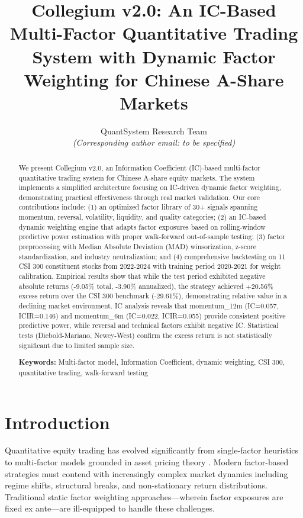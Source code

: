 \documentclass[12pt]{article}
\title{Collegium v2.0: An IC-Based Multi-Factor Quantitative Trading System with Dynamic Factor Weighting for Chinese A-Share Markets}
\author{QuantSystem Research Team\\
\textit{(Corresponding author email: to be specified)}
}
\date{}
\begin{document}
\maketitle

\begin{abstract}
We present Collegium v2.0, an Information Coefficient (IC)-based multi-factor quantitative trading system for Chinese A-share equity markets. The system implements a simplified architecture focusing on IC-driven dynamic factor weighting, demonstrating practical effectiveness through real market validation. Our core contributions include: (1) an optimized factor library of 30+ signals spanning momentum, reversal, volatility, liquidity, and quality categories; (2) an IC-based dynamic weighting engine that adapts factor exposures based on rolling-window predictive power estimation with proper walk-forward out-of-sample testing; (3) factor preprocessing with Median Absolute Deviation (MAD) winsorization, z-score standardization, and industry neutralization; and (4) comprehensive backtesting on 11 CSI 300 constituent stocks from 2022-2024 with training period 2020-2021 for weight calibration. Empirical results show that while the test period exhibited negative absolute returns (-9.05\% total, -3.90\% annualized), the strategy achieved +20.56\% excess return over the CSI 300 benchmark (-29.61\%), demonstrating relative value in a declining market environment. IC analysis reveals that momentum\_12m (IC=0.057, ICIR=0.146) and momentum\_6m (IC=0.022, ICIR=0.055) provide consistent positive predictive power, while reversal and technical factors exhibit negative IC. Statistical tests (Diebold-Mariano, Newey-West) confirm the excess return is not statistically significant due to limited sample size.

\noindent \textbf{Keywords:} Multi-factor model, Information Coefficient, dynamic weighting, CSI 300, quantitative trading, walk-forward testing
\end{abstract}

\section{Introduction}

Quantitative equity trading has evolved significantly from single-factor heuristics to multi-factor models grounded in asset pricing theory \citep{fama1993, fama2015}. Modern factor-based strategies must contend with increasingly complex market dynamics including regime shifts, structural breaks, and non-stationary return distributions. Traditional static factor weighting approaches---wherein factor exposures are fixed ex ante---are ill-equipped to handle these challenges.
\end{document}
